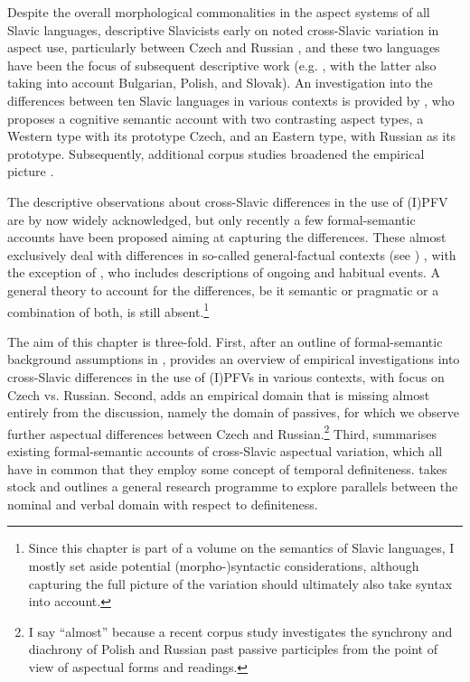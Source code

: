 \documentclass[output=paper,colorlinks,citecolor=brown]{langscibook}
\begin{document}
\noindent Despite the overall morphological commonalities in the aspect systems of all Slavic languages, descriptive Slavicists early on noted cross-Slavic variation in aspect use, particularly between Czech and Russian \citep[][]{dokulil48%
,krizkova55,%
bares56,%
bondarko59,ivancev59/60,%
sirokova71}, and these two languages have been the focus of subsequent descriptive work (e.g. \citealt{eckert84,stunova93,petruxina00}, with the latter also taking into account Bulgarian, Polish, and Slovak). An investigation into the differences between ten Slavic languages in various contexts is provided by \citet{Dickey2000}, who proposes a cognitive semantic account with two contrasting aspect types, a Western type with its prototype Czech, and an Eastern type, with Russian as its prototype. Subsequently, additional corpus studies broadened the empirical picture \citep[][]{gehrke02,waldenfels12,waldenfels14,alvestad13,duebbersdiss,klimek22}. 

The descriptive observations about cross-Slavic differences in the use of (I)PFV are by now widely acknowledged, but only recently a few formal-semantic accounts have been proposed aiming at capturing the differences. These almost exclusively deal with differences in so-called general-factual contexts (see ) \citep[][]{alvestad13,Mueller-Reichau2018a,klimek22}, with the exception of \citet{mueller23}, who includes descriptions of ongoing and habitual events. A general theory to account for the differences, be it semantic or pragmatic or a combination of both, is still absent.\footnote{Since this chapter is part of a volume on the semantics of Slavic languages, I mostly set aside potential (morpho-)syntactic considerations, although capturing the full picture of the variation should ultimately also take syntax into account.}  

The aim of this chapter is three-fold. First, after an outline of formal-semantic background assumptions in ,  provides an overview of empirical investigations into cross-Slavic differences in the use of (I)PFVs in various contexts, with focus on Czech vs. Russian. Second,  adds an empirical domain that is missing almost entirely from the discussion, namely the domain of passives, for which we observe further aspectual differences between Czech and Russian.\footnote{I say ``almost'' because a recent corpus study \citep{wiemer+23} investigates the synchrony and diachrony of Polish and Russian past passive participles from the point of view of aspectual forms and readings.} Third,  summarises existing formal-semantic accounts of cross-Slavic aspectual variation, which all have in common that they employ some concept of temporal definiteness.  takes stock and outlines a general research programme to explore parallels between the nominal and verbal domain with respect to definiteness. 
\end{document}
